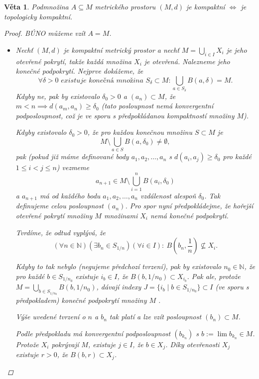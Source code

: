 \documentclass[10pt,a4paper]{article}
\newcommand{\N}{{\mathbb{N}}}       %
\newtheorem*{thm}{Věta}
\begin{document}
\begin{thm} Podmnožina $A \subseteq M$ metrického prostoru $ (M, d) $ je kompaktní $\iff$ je topologicky kompaktní.\normalfont
	\begin{proof}
		BÚNO můžeme vzít $A = M$.
		\begin{itemize}
			\item [$ \Rightarrow $] Nechť $(M, d)$ je kompaktní metrický prostor a nechť $\displaystyle M = \bigcup_{i \in I} X_i$ je jeho otevřené pokrytí, takže každá množina $ X_i $ je otevřená.
			Nalezneme jeho konečné podpokrytí. 
			Nejprve dokážeme, že \[\forall \delta > 0 \textit{ existuje konečná množina } S_{\delta} \subset M : \bigcup_{a\in S_{\delta}} B(a, \delta) = M .\]
			Kdyby ne, pak by existovalo $\delta_0 > 0$ a $(a_n) \subset M$, že $m < n \implies d(a_m , a_n) \geq \delta_0$ 
			\textit{(tato posloupnost nemá konvergentní podposloupnost, což je ve sporu s předpokládanou kompaktností množiny $ M $)}. 
			
			Kdyby existovalo $\delta_0 > 0$, že pro každou konečnou množinu $S \subset M$ je \[M\setminus \bigcup_{a\in S} B(a,\delta_0) \neq \emptyset,\]
			pak \textit{(pokud již máme definované body $a_1 , a_2 , \ldots , a_n$ s $d(a_i , a_j ) \geq \delta_0$ pro každé $1 \leq i < j \leq n$)} vezmeme $$a_{n+1} \in M \setminus \bigcup_{i=1}^n B(a_i, \delta_0)$$ a $a_{n+1}$ má od každého bodu $a_1, a_2,\ldots , a_n$ vzdálenost alespoň $\delta_0$.
			Tak definujeme celou posloupnost $(a_n)$.
			\newpage
			Pro spor nyní předpokládejme, že hořejší otevřené pokrytí množiny $ M $ množinami $X_i$ nemá konečné podpokrytí.
			
			Tvrdíme, že odtud vyplývá, že \[(\forall n \in \N) (\exists b_n \in S_{1/n}) (\forall i \in I) :~ B\left(b_n , \frac{1}{n}\right) \nsubseteq X_i.\] 
			
			Kdyby to tak nebylo \textit{(negujeme předchozí tvrzení)}, pak by existovalo $n_0 \in \N$, že pro každé $b \in S_{1/n_0}$ existuje $i_b \in I$, že $B(b, 1/n_0) \subset X_{i_b}$. 
			Pak ale, protože $M =\displaystyle \bigcup_{b\in S_{1/n_0}} B(b, 1/n_0)$, dávají indexy $J = \{i_b \mid b \in S_{1/n_0}\} \subset I$ (ve sporu s předpokladem) konečné podpokrytí množiny $ M $ .

			Výše uvedené tvrzení o $ n $ a $b_n$ tak platí a lze vzít posloupnost $(b_n) \subset M$. 
			
			Podle předpokladu má konvergentní podposloupnost $(b_{k_n})$ s $b := \lim b_{k_n} \in M$. 
			Protože $X_i$ pokrývají $M$, existuje $j \in I$, že $b \in X_j$. 
			Díky otevřenosti $X_j$ existuje $r > 0$, že $B(b, r) \subset X_j$. 
			

\end{itemize}
\end{proof}
\end{thm}
\end{document}
